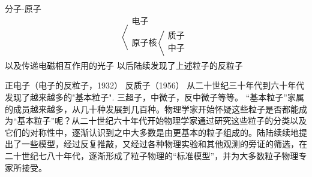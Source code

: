 分子-原子 
\[\left<   \begin{array} {l}  \mbox{电子}\\
 {\mbox{原子核}\left< \begin{array}{c} \mbox{质子}\\ \mbox{中子} \\  
 \end{array}  \right.} 
 \end{array}   \right.  \]
以及传递电磁相互作用的光子    
以后陆续发现了上述粒子的反粒子
    
正电子（电子的反粒子，1932）   
反质子（1956）    
从二十世纪三十年代到六十年代发现了越来越多的"基本粒子". 三超子，中微子，反中微子等等。  
“基本粒子”家属的成员越来越多，从几十种发展到几百种。物理学家开始怀疑这些粒子是否都能成为“基本粒子”呢？从二十世纪六十年代开始物理学家通过研究这些粒子的分类以及它们的对称性中，逐渐认识到之中大多数是由更基本的粒子组成的。陆陆续续地提出了一些模型，经过反复推敲，又经过各种物理实验和其他观测的旁证的筛选，在二十世纪七八十年代，逐渐形成了粒子物理的“标准模型”，并为大多数粒子物理专家所接受。

